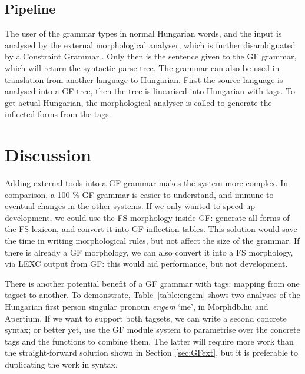 \documentclass[10pt,a4paper]{article}
\begin{document}
\subsection{Pipeline}

The user of the grammar types in normal Hungarian words, and the input is analysed 
by the external morphological analyser, which is further disambiguated by a 
Constraint Grammar \cite{karlsson1995constraint}. Only then is the sentence given to the GF grammar, 
which will return the syntactic parse tree.
The grammar can also be used in translation from another language
to Hungarian. First the source language is analysed into a GF tree,
then the tree is linearised into Hungarian with tags. To get actual
Hungarian, the morphological analyser is called to generate
the inflected forms from the tags.



\section{Discussion}

Adding external tools into a GF grammar  
makes the system more complex. In comparison, a 100 \% GF grammar is
easier to understand, and immune to eventual changes in the other systems. 
If we only wanted to speed up development, we could use the FS morphology
inside GF: generate all forms of the FS lexicon, and convert it into GF
inflection tables. This solution would save the time in writing
morphological rules, but not affect the size of the grammar.
If there is already a GF morphology, we can also convert it into a FS
morphology, via LEXC output from GF: this would aid performance, but not development.

There is another potential benefit of a GF grammar with tags: mapping from one tagset to another.
To demonstrate, Table~\ref{table:engem} shows two analyses of the Hungarian first
person singular pronoun \emph{engem} `me', in Morphdb.hu \cite{tron2006morphdb} and Apertium.
If we want to support both tagsets, we can write a
second concrete syntax; or better yet, use the GF module system to
parametrise over the concrete tags and the functions to combine
them. The latter will require more work than the straight-forward
solution shown in Section~\ref{sec:GFext}, but it is preferable to duplicating the work in syntax.
\end{document}
